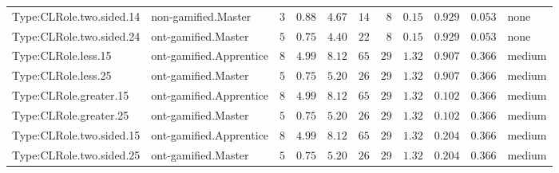 \documentclass[6pt,a4paper]{article}
\begin{document}
{\begin{longtable}{llrrrrrrrrl}
Type:CLRole.two.sided.14&non-gamified.Master&$ 3$&$0.88$&$ 4.67$&$ 14$&$ 8$&$ 0.15$&$0.929$&$0.053$&none\tabularnewline
Type:CLRole.two.sided.24&ont-gamified.Master&$ 5$&$0.75$&$ 4.40$&$ 22$&$ 8$&$ 0.15$&$0.929$&$0.053$&none\tabularnewline
Type:CLRole.less.15&ont-gamified.Apprentice&$ 8$&$4.99$&$ 8.12$&$ 65$&$29$&$ 1.32$&$0.907$&$0.366$&medium\tabularnewline
Type:CLRole.less.25&ont-gamified.Master&$ 5$&$0.75$&$ 5.20$&$ 26$&$29$&$ 1.32$&$0.907$&$0.366$&medium\tabularnewline
Type:CLRole.greater.15&ont-gamified.Apprentice&$ 8$&$4.99$&$ 8.12$&$ 65$&$29$&$ 1.32$&$0.102$&$0.366$&medium\tabularnewline
Type:CLRole.greater.25&ont-gamified.Master&$ 5$&$0.75$&$ 5.20$&$ 26$&$29$&$ 1.32$&$0.102$&$0.366$&medium\tabularnewline
\newpage
Type:CLRole.two.sided.15&ont-gamified.Apprentice&$ 8$&$4.99$&$ 8.12$&$ 65$&$29$&$ 1.32$&$0.204$&$0.366$&medium\tabularnewline
Type:CLRole.two.sided.25&ont-gamified.Master&$ 5$&$0.75$&$ 5.20$&$ 26$&$29$&$ 1.32$&$0.204$&$0.366$&medium\tabularnewline
\hline
\end{longtable}}
\end{document}
